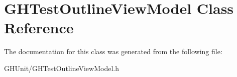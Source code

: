 \hypertarget{interface_g_h_test_outline_view_model}{
\section{\-G\-H\-Test\-Outline\-View\-Model \-Class \-Reference}
\label{interface_g_h_test_outline_view_model}
}


\-The documentation for this class was generated from the following file\-:\begin{DoxyCompactItemize}
\item 
\-G\-H\-Unit/\-G\-H\-Test\-Outline\-View\-Model.\-h\end{DoxyCompactItemize}
